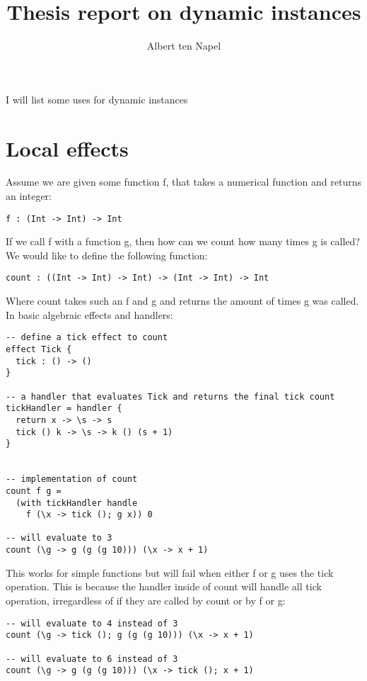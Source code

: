 \documentclass[12pt]{article}
\title{Thesis report on dynamic instances}
\author{Albert ten Napel}
\date{}
\begin{document}
\maketitle

I will list some uses for dynamic instances

\section{Local effects}

Assume we are given some function f, that takes a numerical function and returns an integer:

\begin{verbatim}
f : (Int -> Int) -> Int
\end{verbatim}

If we call f with a function g, then how can we count how many times g is called?
We would like to define the following function:

\begin{verbatim}
count : ((Int -> Int) -> Int) -> (Int -> Int) -> Int
\end{verbatim}

Where count takes such an f and g and returns the amount of times g was called.
In basic algebraic effects and handlers:

\begin{verbatim}
-- define a tick effect to count
effect Tick {
  tick : () -> ()
}

-- a handler that evaluates Tick and returns the final tick count
tickHandler = handler {
  return x -> \s -> s
  tick () k -> \s -> k () (s + 1)
}


-- implementation of count
count f g =
  (with tickHandler handle
    f (\x -> tick (); g x)) 0

-- will evaluate to 3
count (\g -> g (g (g 10))) (\x -> x + 1)
\end{verbatim}

This works for simple functions but will fail when either f or g uses the tick operation.
This is because the handler inside of count will handle all tick operation, irregardless of if they are called by count or by f or g:

\begin{verbatim}
-- will evaluate to 4 instead of 3
count (\g -> tick (); g (g (g 10))) (\x -> x + 1)

-- will evaluate to 6 instead of 3
count (\g -> g (g (g 10))) (\x -> tick (); x + 1)
\end{verbatim}
\end{document}
